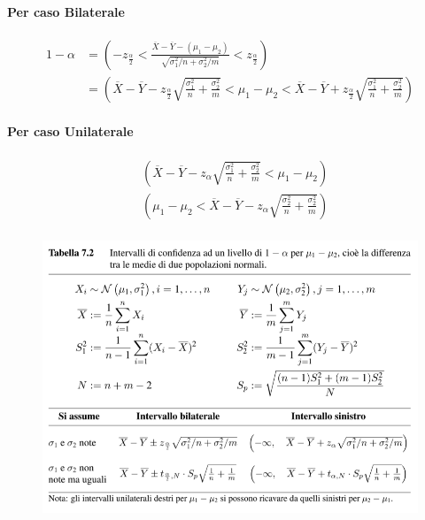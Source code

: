 \documentclass[]{article}
\begin{document}
    \paragraph{Per caso Bilaterale}
    \begin{equation*}
        \begin{aligned}
            1-\alpha & =\left(-z_{\frac{\alpha}{2}}<\frac{\overline{X}-\overline{Y}-\left(\mu_1-\mu_2\right)}{\sqrt{\sigma_1^2 / n+\sigma_2^2 / m}}<z_{\frac{\alpha}{2}}\right) \\
            & =\left(\overline{X}-\overline{Y}-z_{\frac{\alpha}{2}} \sqrt{\frac{\sigma_1^2}{n}+\frac{\sigma_2^2}{m}}<\mu_1-\mu_2<\overline{X}-\overline{Y}+z_{\frac{\alpha}{2}} \sqrt{\frac{\sigma_1^2}{n}+\frac{\sigma_2^2}{m}}\right)
            \end{aligned}
    \end{equation*}
    \paragraph{Per caso Unilaterale}
    \begin{equation*}
        \begin{aligned}
            &\left( \overline{X} - \overline{Y} - z_{\alpha} \sqrt{\frac{\sigma^2_1}{n} + \frac{\sigma^2_2}{m}}< \mu_1 - \mu_2 \right) \\
            &\left( \mu_1 - \mu_2 < \overline{X} - \overline{Y} - z_{\alpha} \sqrt{\frac{\sigma^2_2}{n} + \frac{\sigma^2_2}{m}} \right) \\
           \end{aligned}
    \end{equation*}
    \begin{figure}[H]
        \includegraphics[width=\textwidth]{images/Screenshot_1.png}
    \end{figure}
\end{document}
